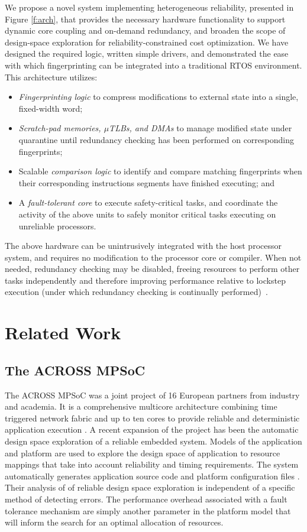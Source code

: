 We propose a novel system implementing heterogeneous reliability, presented in Figure \ref{f:arch}, that provides the necessary hardware functionality to support dynamic core coupling and on-demand redundancy, and broaden the scope of design-space exploration for reliability-constrained cost optimization.
	We have designed the required logic, written simple drivers, and demonstrated the ease with which fingerprinting can be integrated into a traditional RTOS environment.	
	This architecture utilizes:
\begin{itemize}
\item	\emph{Fingerprinting logic} to compress modifications to external state into a single, fixed-width word;
\item	\emph{Scratch-pad memories, $\mu$TLBs, and DMAs} to manage modified state under quarantine until redundancy checking has been performed on corresponding fingerprints;
\item	Scalable \emph{comparison logic} to identify and compare matching fingerprints when their corresponding instructions segments have finished executing; and
\item	A \emph{fault-tolerant core} to execute safety-critical tasks, and coordinate the activity of the above units to safely monitor critical tasks executing on unreliable processors.
\end{itemize}
	The above hardware can be unintrusively integrated with the host processor system, and requires no modification to the processor core or compiler.
	When not needed, redundancy checking may be disabled, freeing resources to perform other tasks independently and therefore improving performance relative to lockstep execution (under which redundancy checking is continually performed)~\cite{Meyer:CASES11}.
	
\section{Related Work}
\subsection{The ACROSS MPSoC}


The ACROSS MPSoC was a joint project of 16 European partners from industry and academia. It is a comprehensive multicore architecture combining time triggered network fabric and up to ten cores to provide reliable and deterministic application execution \cite{el2013across}. A recent expansion of the project has been the automatic design space exploration of a reliable embedded system. Models of the application and platform are used to explore the design space of application to resource mappings that take into account reliability and timing requirements. The system automatically generates application source code and platform configuration files \cite{huang2014framework}. Their analysis of of reliable design space exploration  is independent of a specific method of detecting errors. The performance overhead associated with a fault tolerance mechanism are simply another parameter in the platform model that will inform the search for an optimal allocation of resources. 


